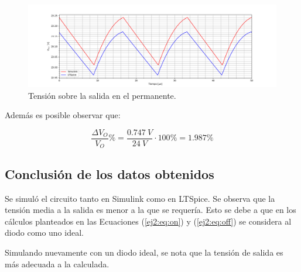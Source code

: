 \begin{figure}[H]
	\centering
	\includegraphics[width=0.9\linewidth]{ImagenesEjercicio-2/vout.png}
	\caption{Tensión sobre la salida en el permanente.}
	\label{fig:ej2:vout}
\end{figure}

Además es posible observar que:

\begin{equation*}
\frac{\Delta V_O}{V_O} \% = \frac{0.747 \ V}{24 \ V} \cdot 100 \% = 1.987 \%
\end{equation*}

\subsection{Conclusión de los datos obtenidos}

Se simuló el circuito tanto en Simulink como en LTSpice. Se observa que la tensión media a la salida es menor a la que se requería. Esto se debe a que en los cálculos planteados en las Ecuaciones (\ref{ej2:eq:on}) y (\ref{ej2:eq:off}) se considera al diodo como uno ideal.

Simulando nuevamente con un diodo ideal, se nota que la tensión de salida es más adecuada a la calculada.

